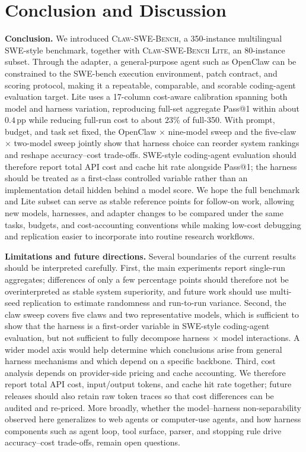 \section{Conclusion and Discussion}\label{sec:discussion}
\textbf{Conclusion.}
We introduced \textsc{Claw-SWE-Bench}, a 350-instance multilingual SWE-style benchmark, together with \textsc{Claw-SWE-Bench Lite}, an 80-instance subset. Through the adapter, a general-purpose agent such as OpenClaw can be constrained to the SWE-bench execution environment, patch contract, and scoring protocol, making it a repeatable, comparable, and scorable coding-agent evaluation target. Lite uses a 17-column cost-aware calibration spanning both model and harness variation, reproducing full-set aggregate Pass@1 within about $0.4$\,pp while reducing full-run cost to about $23\%$ of full-350. With prompt, budget, and task set fixed, the OpenClaw $\times$ nine-model sweep and the five-claw $\times$ two-model sweep jointly show that harness choice can reorder system rankings and reshape accuracy--cost trade-offs. SWE-style coding-agent evaluation should therefore report total API cost and cache hit rate alongside Pass@1; the harness should be treated as a first-class controlled variable rather than an implementation detail hidden behind a model score. We hope the full benchmark and Lite subset can serve as stable reference points for follow-on work, allowing new models, harnesses, and adapter changes to be compared under the same tasks, budgets, and cost-accounting conventions while making low-cost debugging and replication easier to incorporate into routine research workflows.

\textbf{Limitations and future directions.}
Several boundaries of the current results should be interpreted carefully. First, the main experiments report single-run aggregates; differences of only a few percentage points should therefore not be overinterpreted as stable system superiority, and future work should use multi-seed replication to estimate randomness and run-to-run variance. Second, the claw sweep covers five claws and two representative models, which is sufficient to show that the harness is a first-order variable in SWE-style coding-agent evaluation, but not sufficient to fully decompose harness $\times$ model interactions. A wider model axis would help determine which conclusions arise from general harness mechanisms and which depend on a specific backbone. Third, cost analysis depends on provider-side pricing and cache accounting. We therefore report total API cost, input/output tokens, and cache hit rate together; future releases should also retain raw token traces so that cost differences can be audited and re-priced. More broadly, whether the model--harness non-separability observed here generalizes to web agents or computer-use agents, and how harness components such as agent loop, tool surface, parser, and stopping rule drive accuracy--cost trade-offs, remain open questions.


